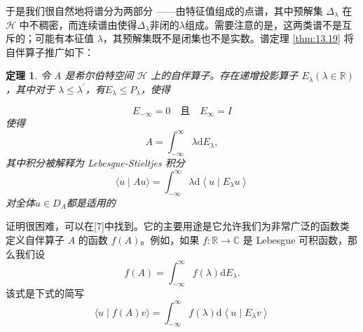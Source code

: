 \documentclass[hyperref,UTF8]{ctexbook}
\newtheorem{theorem}{定理}[chapter]
\begin{document}
于是我们很自然地将谱分为两部分 ——由特征值组成的点谱，其中预解集 \(\Delta_{\lambda}\) 在 \(\mathcal{H}\) 中不稠密，而连续谱由使得\(\Delta_{\lambda}\)非闭的\(\lambda\)组成。需要注意的是，这两类谱不是互斥的；可能有本征值 \(\lambda\)，其预解集既不是闭集也不是实数。谱定理 \ref{thm:13.19} 将自伴算子推广如下： 
\begin{theorem}\label{thm:13.25}
    令 A 是希尔伯特空间 \(\mathcal{H}\) 上的自伴算子。存在递增投影算子 \(E_{\lambda}(\lambda \in \mathbb{R})\)，其中对于 \( \lambda \leq \lambda^{\prime}\)，有\(E_{\lambda} \leq P_{\lambda}\)，使得

\[
E_{-\infty}=0 \quad \text {且} \quad E_{\infty}=I
\]
使得
\[
A=\int_{-\infty}^{\infty} \lambda \mathrm{d} E_{\lambda},
\]
其中积分被解释为 Lebesgue-Stieltjes 积分
\[
\langle u \mid A u\rangle=\int_{-\infty}^{\infty} \lambda \mathrm{d}\left\langle u \mid E_{\lambda} u\right\rangle
\]
对全体\(u \in D_{A}\)都是适用的
\end{theorem} 
证明很困难，可以在[7]中找到。它的主要用途是它允许我们为非常广泛的函数类定义自伴算子 \(A\) 的函数 \(f(A)\)。例如，如果 \(f: \mathbb{R} \rightarrow \mathbb{C}\) 是 Lebesgue 可积函数，那么我们设
\[
f(A)=\int_{-\infty}^{\infty} f(\lambda) \mathrm{d} E_{\lambda} .
\]
该式是下式的简写
\[
\langle u \mid f(A) v\rangle=\int_{-\infty}^{\infty} f(\lambda) \mathrm{d}\left\langle u \mid E_{\lambda} v\right\rangle
\]
\end{document}
